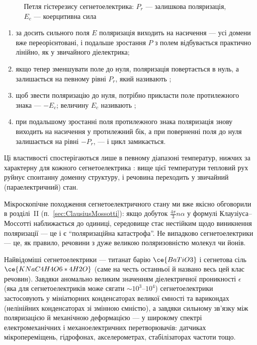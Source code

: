 \begin{figure}[h!]\centering
	\caption{Петля гістерезису сегнетоелектрика: $P_r$ --- залишкова поляризація, $E_c$ ---
		коерцитивна сила\label{pic:Hysteresis}}
\end{figure}
\begin{enumerate}
	\item за досить сильного поля $E$ поляризація виходить на насичення --- усі домени вже переорієнтовані, і подальше зростання $P$ з полем
	      відбувається практично лінійно, як у звичайного діелектрика;
	\item якщо тепер зменшувати поле до нуля, поляризація  повертається в нуль, а залишається на певному рівні $P_r$, який називають
	      ;
	\item щоб звести поляризацію до нуля, потрібно прикласти поле протилежного знака --- $-E_c$; величину $E_c$ називають ;
	\item при подальшому зростанні поля протилежного знака поляризація знову виходить на насичення у протилежний бік, а при поверненні поля до нуля
	      залишається на рівні $-P_r$, --- і цикл замикається.
\end{enumerate}
Ці властивості спостерігаються лише в певному діапазоні температур, нижчих за характерну для кожного сегнетоелектрика : вище
цієї температури тепловий рух руйнує спонтанну доменну структуру, і речовина переходить у звичайний (параелектричний) стан.

\begin{Attention}
	Мікроскопічне походження сегнетоелектричного стану ми вже якісно обговорили в розділі~II (п.~\ref{sec:ClausiusMossotti}): якщо добуток
	$\frac{4\pi}{3}n\alpha$ у формулі Клаузіуса--Моссотті наближається до одиниці, середовище стає нестійким щодо виникнення 
	поляризації --- це і є \enquote{поляризаційна катастрофа}. Не випадково сегнетоелектрики --- це, як правило, речовини з дуже великою
	поляризовністю молекул чи йонів.
\end{Attention}

Найвідоміші сегнетоелектрики --- титанат барію $\ce{BaTiO3}$ і сегнетова сіль $\ce{KNaC4H4O6*4H2O}$ (саме на честь останньої й названо весь цей клас
речовин). Завдяки аномально великим значенням діелектричної проникності $\epsilon$ (яка для сегнетоелектриків може сягати $\sim 10^3$--$10^4$)
сегнетоелектрики застосовують у мініатюрних конденсаторах великої ємності та варикондах (нелінійних конденсаторах зі змінною ємністю), а завдяки
сильному зв'язку між поляризацією й механічною деформацією --- у широкому спектрі електромеханічних і механоелектричних перетворювачів: датчиках
мікропереміщень, гідрофонах, акселерометрах, стабілізаторах частоти тощо.

